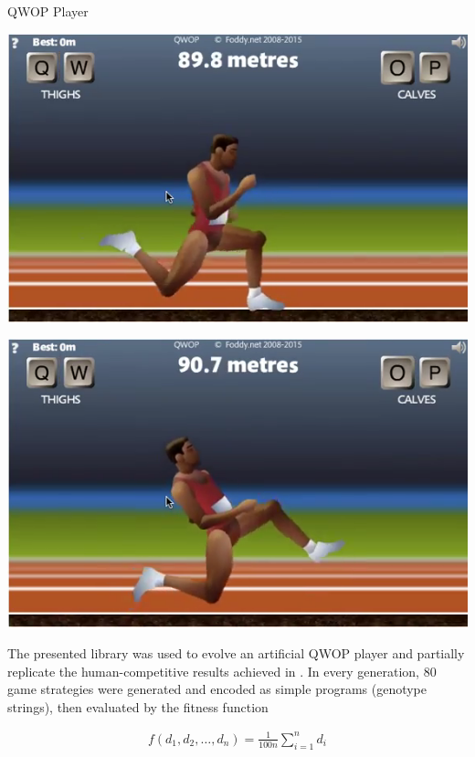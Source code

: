 \documentclass[a0paper,portrait]{baposter}
\begin{document}
\begin{poster}
\begin{posterbox}[name=qwop,column=2]{QWOP Player}
	\parbox[c]{0.49\linewidth}{\includegraphics[width=\linewidth]{runner1}}
	\hfill
	\parbox[c]{0.49\linewidth}{\includegraphics[width=\linewidth]{runner2}}

	\vspace{0.5em}

	The presented library was used to evolve an artificial QWOP player and partially replicate the human-competitive results achieved in \cite{EvolvingQwopGaits}. In every generation, 80 game strategies were generated and encoded as simple programs (genotype strings), then evaluated by the fitness function

	\vspace{-1.7em}

	\begin{align*}
		f(d_1,d_2,\dots,d_n) = \frac{1}{100n} \sum_{i=1}^n d_i
	\end{align*}

	\vspace{-0.5em}


\end{posterbox}
\end{poster}
\end{document}
